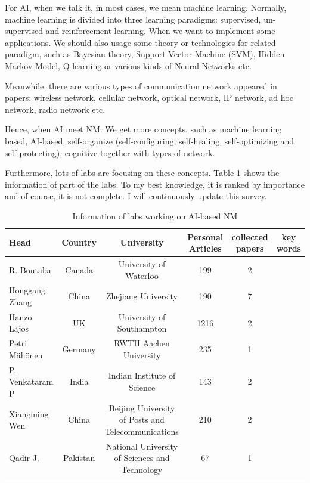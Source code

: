 \documentclass[journal,UTF8]{IEEEtran}
\begin{document}
For AI, when we talk it, in most cases, we mean machine learning. Normally, machine learning is divided into three learning paradigms: supervised, un-supervised and reinforcement learning. When we want to implement some applications. We should also usage some theory or technologies for related paradigm, such as Bayesian theory, Support Vector Machine (SVM), Hidden Markov Model, Q-learning or various kinds of Neural Networks etc. 

Meanwhile, there are various types of communication network appeared in papers: wireless network, cellular network, optical network, IP network, ad hoc network, radio network etc.

Hence, when AI meet NM. We get more concepts, such as machine learning based, AI-based, self-organize (self-configuring, self-healing, self-optimizing and self-protecting), cognitive together with types of network.  

Furthermore, lots of labs are focusing on these concepts. Table \ref{table:Labs} shows the information of part of the labs. To my best knowledge, it is ranked by importance and of course, it is not complete. I will continuously update this survey.

\begin{table}
	\scriptsize \caption{Information of labs working on AI-based NM}
	\label{table:Labs}
	\begin{center}
		\renewcommand{\arraystretch}{1.4}
		\setlength\tabcolsep{3pt}
		\begin{tabular}{|l|c|c|c|c|c|}
			\hline
			Head&Country& University &Personal Articles& collected papers  & key words\\
			\hline
			R. Boutaba &Canada &University of Waterloo&199  & 2      &       \\
			\hline
			Honggang Zhang & China & Zhejiang University&190  & 7  &       \\
            \hline
 			Hanzo Lajos  & UK  & University of Southampton&1216 & 2  &       \\
            \hline  
 			Petri Mähönen&Germany&RWTH Aachen University&235 & 1& \\
            \hline  
 			P. Venkataram P&India&Indian Institute of Science&143 & 2& \\
            \hline 
 			Xiangming Wen&China& Beijing University of Posts and Telecommunications &210& 2  &       \\
            \hline  
 			Qadir J.&Pakistan&National University of Sciences and Technology&67&1& \\
            \hline         
		\end{tabular}
	\end{center}
\end{table}
\end{document}
